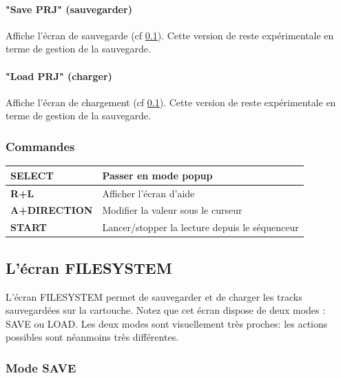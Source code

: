 \documentclass[12pt,a4paper]{article}
\begin{document}
        \paragraph{"Save PRJ" (sauvegarder)}  Affiche l'écran de sauvegarde (cf \ref{filesystem}). Cette version de \FAT reste expérimentale en terme de gestion de la sauvegarde.
        
        \paragraph{"Load PRJ" (charger)} Affiche l'écran de chargement (cf \ref{filesystem}). Cette version de \FAT reste expérimentale en terme de gestion de la sauvegarde.
    
        \subsubsection{Commandes}        
        \tablelasttail{\hline}
        \begin{supertabular}{|l|p{11cm}|}
        \hline
            {\bf SELECT} & Passer en mode popup \\
            \hline
            {\bf R+L} & Afficher l'écran d'aide \\
            \hline
            {\bf A+DIRECTION} & Modifier la valeur sous le curseur \\
            \hline
            {\bf START} & Lancer/stopper la lecture depuis le séquenceur \\ 
        \hline
        \end{supertabular}
    
    \subsection{L'écran FILESYSTEM}\label{filesystem}
    
    L'écran FILESYSTEM permet de sauvegarder et de charger les tracks sauvegardées sur la cartouche. Notez que cet écran dispose de deux modes : SAVE ou LOAD. Les deux modes sont visuellement très proches: les actions possibles sont néanmoins très différentes.
    
        \subsubsection{Mode SAVE}
        
\end{document}
